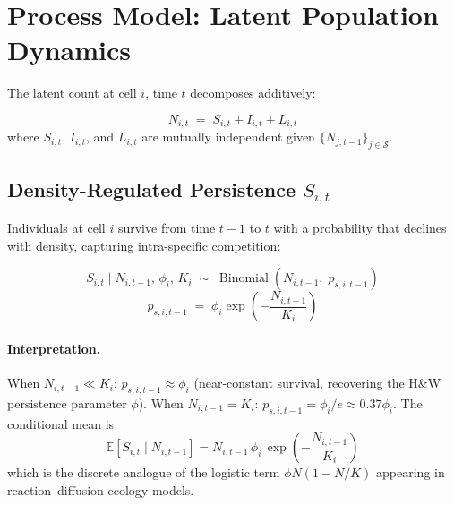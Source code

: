 \documentclass[12pt,a4paper]{article}
\theoremstyle{definition}
\newcommand{\E}{\mathbb{E}}
\newcommand{\Bin}{\operatorname{Binomial}}
\renewcommand{\S}{\mathcal{S}}
\begin{document}
\section{Process Model: Latent Population Dynamics}
\label{sec:process}

The latent count at cell $i$, time $t$ decomposes additively:

\begin{keybox}
\begin{equation}
  N_{i,t} \;=\; S_{i,t} + I_{i,t} + L_{i,t}
  \label{eq:decomp}
\end{equation}
where $S_{i,t}$, $I_{i,t}$, and $L_{i,t}$ are mutually independent given
$\{N_{j,t-1}\}_{j\in\S}$.
\end{keybox}

\subsection{Density-Regulated Persistence \texorpdfstring{$S_{i,t}$}{S}}

Individuals at cell $i$ survive from time $t-1$ to $t$ with a probability
that declines with density, capturing intra-specific competition:

\begin{equation}
  S_{i,t} \;\Big|\; N_{i,t-1},\, \phi_i,\, K_i
  \;\sim\;
  \Bin\!\left(N_{i,t-1},\; p_{s,i,t-1}\right)
  \label{eq:survival}
\end{equation}
\begin{equation}
  p_{s,i,t-1} \;=\; \phi_i \exp\!\left(-\frac{N_{i,t-1}}{K_i}\right)
  \label{eq:survival-prob}
\end{equation}

\paragraph{Interpretation.}
When $N_{i,t-1} \ll K_i$: $p_{s,i,t-1} \approx \phi_i$ (near-constant survival,
recovering the H\&W persistence parameter $\phi$).  When $N_{i,t-1} = K_i$:
$p_{s,i,t-1} = \phi_i/e \approx 0.37\phi_i$.  The conditional mean is
\begin{equation}
  \E\!\left[S_{i,t} \;\big|\; N_{i,t-1}\right]
  = N_{i,t-1}\, \phi_i\, \exp\!\!\left(-\frac{N_{i,t-1}}{K_i}\right)
  \label{eq:survival-mean}
\end{equation}
which is the discrete analogue of the logistic term $\phi N(1-N/K)$ appearing
in reaction--diffusion ecology models.
\end{document}
